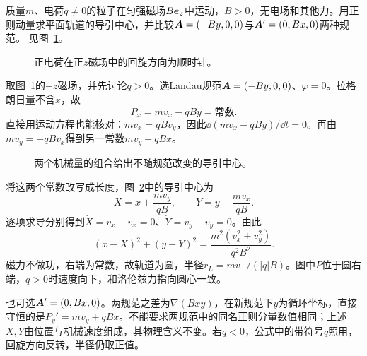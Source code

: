 \begin{example}[正则动量与匀强磁场中的圆轨道]\label{ex:i1-e3}
质量$m$、电荷$q\ne0$的粒子在匀强磁场$B\bm{e}_z$中运动，$B>0$，无电场和其他力。用正则动量求平面轨道的导引中心，并比较$\bm{A}=(-By,0,0)$与$\bm{A}'=(0,Bx,0)$两种规范。 见图~\ref{fig:i1-e3-q}。
\end{example}

\begin{figure}[H]\centering
{}
\caption{正电荷在正$z$磁场中的回旋方向为顺时针。}\label{fig:i1-e3-q}
\end{figure}
\begin{solution}
取图~\ref{fig:i1-e3-q}的$+z$磁场，并先讨论$q>0$。选Landau规范$\bm{A}=(-By,0,0)$、$\varphi=0$。拉格朗日量不含$x$，故
\[P_x=mv_x-qBy=\text{常数}.
\]
直接用运动方程也能核对：$m\dot v_x=qBv_y$，因此$\dd(mv_x-qBy)/\dd t=0$。再由$m\dot v_y=-qBv_x$得到另一常数$mv_y+qBx$。


\begin{figure}[H]\centering
{}
\caption{两个机械量的组合给出不随规范改变的导引中心。}\label{fig:i1-e3-s}
\end{figure}

将这两个常数改写成长度，图~\ref{fig:i1-e3-s}中的导引中心为
\[\boxed{X=x+\frac{mv_y}{qB},\qquad
Y=y-\frac{mv_x}{qB}}.
\]
逐项求导分别得到$\dot X=v_x-v_x=0$、$\dot Y=v_y-v_y=0$。由此
\[(x-X)^2+(y-Y)^2=\frac{m^2(v_x^2+v_y^2)}{q^2B^2}.
\]
磁力不做功，右端为常数，故轨道为圆，半径$r_L=mv_\perp/(|q|B)$。图中$P$位于圆右端，$q>0$时速度向下，和洛伦兹力指向圆心一致。

也可选$\bm{A}'=(0,Bx,0)$。两规范之差为$\nabla(Bxy)$，在新规范下$y$为循环坐标，直接守恒的是$P_y'=mv_y+qBx$。不能要求两规范中的同名正则分量数值相同；上述$X,Y$由位置与机械速度组成，其物理含义不变。若$q<0$，公式中的带符号$q$照用，回旋方向反转，半径仍取正值。
\end{solution}


